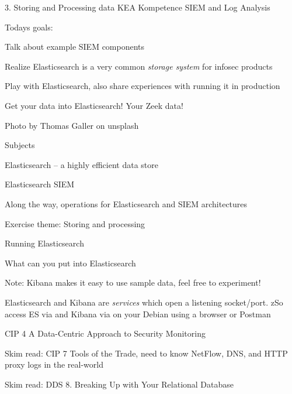 \documentclass[Screen16to9,17pt]{foils}
\begin{document}
\mytitlepage
{3. Storing and Processing data}
{KEA Kompetence SIEM and Log Analysis}




Todays goals:
\begin{list2}
\item Talk about example SIEM components
\item Realize Elasticsearch is a very common \emph{storage system} for infosec products
\item Play with Elasticsearch, also share experiences with running it in production
\item Get your data into Elasticsearch! Your Zeek data!
\end{list2}

Photo by Thomas Galler on unsplash


\begin{list1}
\item Subjects
\begin{list2}
\item Elasticsearch -- a highly efficient data store
\item Elasticsearch SIEM
\item Along the way, operations for Elasticsearch and SIEM architectures
\end{list2}
\item Exercise theme: Storing and processing
\begin{list2}
\item Running Elasticsearch
\item What can you put into Elasticsearch

\end{list2}
\end{list1}




Note: Kibana makes it easy to use sample data, feel free to experiment!

Elasticsearch and Kibana are \emph{services} which open a listening socket/port. zSo access ES via  and Kibana via  on your Debian using a browser or Postman


\begin{list1}
\item CIP 4 A Data-Centric Approach to Security Monitoring
\item Skim read: CIP 7 Tools of the Trade, need to know NetFlow, DNS, and HTTP proxy logs in the real-world
\item Skim read: DDS 8. Breaking Up with Your Relational Database
\end{list1}
\end{document}
